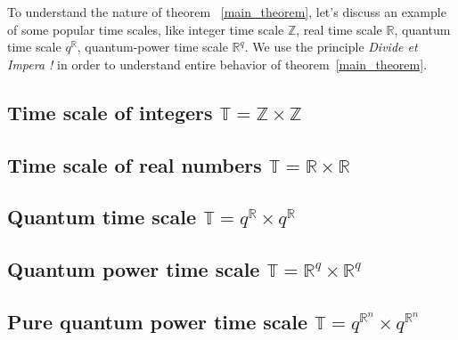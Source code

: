 To understand the nature of theorem ~\ref{main_theorem}, let's discuss an example of some popular time scales,
like integer time scale $\mathbb{Z}$, real time scale $\mathbb{R}$, quantum time scale $q^{\mathbb{R}}$,
quantum-power time scale $\mathbb{R}^q$.
We use the principle \textit{Divide et Impera !} in order to understand entire behavior of theorem~\ref{main_theorem}.

\subsection{Time scale of integers $\mathbb{T} = \mathbb{Z} \times \mathbb{Z}$} \label{subsec:time_scale_z}


\subsection{Time scale of real numbers $\mathbb{T} = \mathbb{R} \times \mathbb{R}$} \label{subsec:time_scale_r}


\subsection{Quantum time scale $\mathbb{T} = q^\mathbb{R} \times q^\mathbb{R}$} \label{subsec:time_scale_qn}


\subsection{Quantum power time scale $\mathbb{T} = \mathbb{R}^q \times \mathbb{R}^q$} \label{subsec:time_scale_nq}


\subsection{Pure quantum power time scale $\mathbb{T} = q^{\mathbb{R}^n} \times q^{\mathbb{R}^n}$} \label{subsec:pure_quantum_power}
